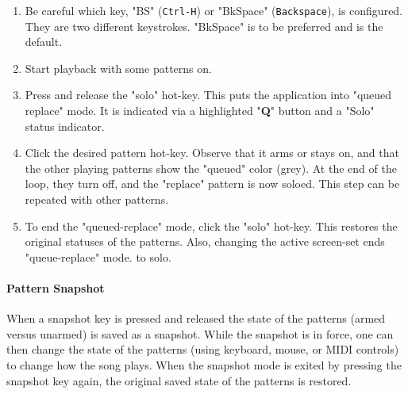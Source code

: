    \begin{enumerate}
      \item Be careful which key, "BS" (\texttt{Ctrl-H})
         or "BkSpace" (\texttt{Backspace}), is configured.
         They are two different keystrokes. "BkSpace" 
         is to be preferred and is the default.
      \item Start playback with some patterns on. 
      \item Press and release
         the "solo" hot-key.  This puts the application into
         "queued replace" mode.
         It is indicated via a highlighted "\textbf{Q}" button
         and a "Solo" status indicator.
      \item Click the desired pattern hot-key.  Observe that it arms or
         stays on, and that the other playing patterns show the "queued" color
         (grey).  At the end of the loop, they turn off, and the "replace"
         pattern is now soloed.
         This step can be repeated with other patterns.
      \item To end
         the "queued-replace" mode, click the "solo" hot-key.
         This restores the original statuses of the patterns.
         Also, changing the active screen-set ends "queue-replace"
         mode.
         to solo.
   \end{enumerate}

\paragraph{Pattern Snapshot}
\label{paragraph:patterns_pattern_snapshot}

   When a snapshot key is pressed and released the state of the patterns
   (armed versus unarmed) is saved as a snapshot.
   While the snapshot is in force, one can then change the state of the patterns
   (using keyboard, mouse, or MIDI controls) to change how the song plays.
   When the snapshot mode is exited by pressing the snapshot key again, the
   original saved state of the patterns is restored.

